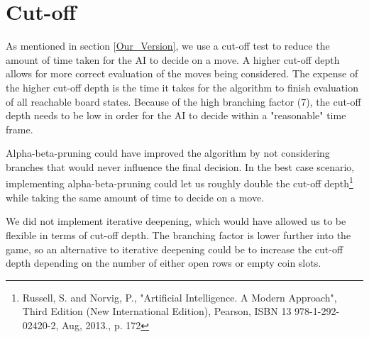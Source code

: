 \section{Cut-off}
\label{Cutoff}
As mentioned in section \ref{Our_Version}, we use a cut-off test to reduce the amount of time taken for the AI to decide on a move. A higher cut-off depth allows for more correct evaluation of the moves being considered. The expense of the higher cut-off depth is the time it takes for the algorithm to finish evaluation of all reachable board states. Because of the high branching factor (7), the cut-off depth needs to be low in order for the AI to decide within a "reasonable" time frame.

Alpha-beta-pruning could have improved the algorithm by not considering branches that would never influence the final decision. In the best case scenario, implementing alpha-beta-pruning could let us roughly double the cut-off depth\footnote{Russell, S. and Norvig, P., "Artificial Intelligence. A Modern Approach", Third Edition (New International Edition), Pearson, ISBN 13 978-1-292-02420-2, Aug, 2013., p. 172} while taking the same amount of time to decide on a move.

We did not implement iterative deepening, which would have allowed us to be flexible in terms of cut-off depth. The branching factor is lower further into the game, so an alternative to iterative deepening could be to increase the cut-off depth depending on the number of either open rows or empty coin slots.